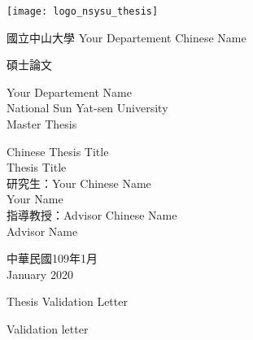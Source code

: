 \documentclass[12pt, twoside , openright]{book}
\begin{document}
	
	\thispagestyle{empty}
	\begin{center}
		\onehalfspacing
		\texttt{[image: logo\_nsysu\_thesis]}
		
		{\chinnesesize 國立中山大學 Your Departement Chinese Name %
			
			碩士論文} %
		
		{\bigsize Your Departement Name\\National Sun Yat-sen University\\}
		{\bigsize Master Thesis\\}
		
		\vspace{2cm}
		{\chinnesesize Chinese Thesis Title\\}
		{\bigsize Thesis Title\\}
		\vspace{2cm}
		{\bigsize \hspace{0pt} 研究生：Your Chinese Name\\ %
			\hspace{70pt} Your Name\\ %
			\hspace{0pt} 指導教授：Advisor Chinese Name\\ %
			\hspace{130pt}Advisor Name \\%
		}
		
		\vspace{1.5cm}
		
		{\bigsize 中華民國109年1月\\
			January 2020\\
			
		}
	\end{center}
	
	\newpage
	\mbox{}
	\thispagestyle{empty}
	\newpage
	
	
	
	\begin{center}
		{\chinnesesize Thesis Validation Letter }
	\end{center}
	Validation letter
	\newpage
	\mbox{}
	\newpage
	
\end{document}
